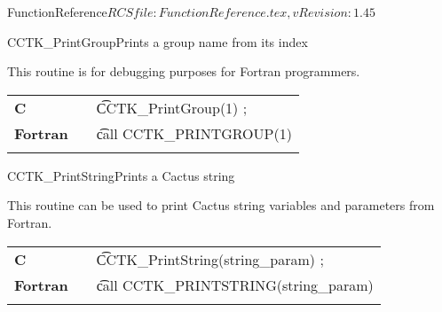 \begin{cactuspart}{5}{FunctionReference}{$RCSfile: FunctionReference.tex,v $}{$Revision: 1.45 $}
\begin{CCTKFunc}{CCTK\_PrintGroup}{Prints a group name from its index}
\label{CCTK-PrintGroup}
\subroutine{}{}{}
\showargs
\begin{params}
\end{params}
\begin{discussion}
This routine is for debugging purposes for Fortran programmers.
\end{discussion}
\begin{examples}
\begin{tabular}{@{}p{3cm}cp{11cm}}
\hfill {\bf C} && {\t CCTK\_PrintGroup(1) ;}
\\
\hfill {\bf Fortran} && {\t call CCTK\_PRINTGROUP(1)}\\
\\
\end{tabular}
\end{examples}
\begin{errorcodes}
\end{errorcodes}
\end{CCTKFunc}

\begin{CCTKFunc}{CCTK\_PrintString}{Prints a Cactus string}
\label{CCTK-PrintString}
\subroutine{}{}{}
\showargs
\begin{params}
\end{params}
\begin{discussion}
This routine can be used to print Cactus string variables and parameters
from Fortran.
\end{discussion}
\begin{examples}
\begin{tabular}{@{}p{3cm}cp{11cm}}
\hfill {\bf C} && {\t CCTK\_PrintString(string\_param) ;}
\\
\hfill {\bf Fortran} && {\t call CCTK\_PRINTSTRING(string\_param)}\\
\\
\end{tabular}
\end{examples}
\begin{errorcodes}
\end{errorcodes}
\end{CCTKFunc}





\end{cactuspart}
